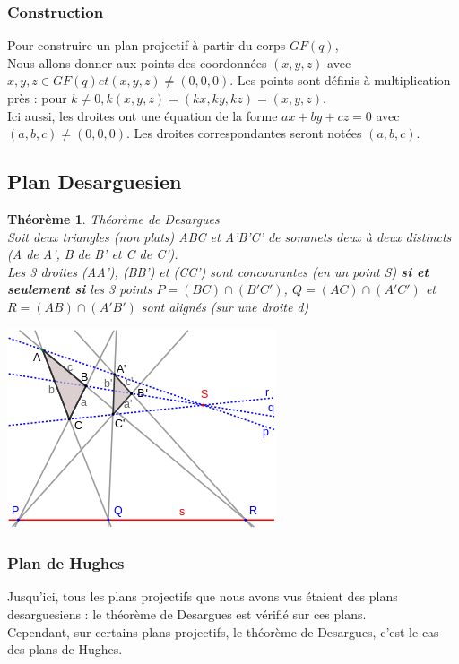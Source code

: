 \documentclass[a4paper]{article}
\newtheorem{Th}[Def]{Théorème}
\begin{document}
\subsubsection*{Construction}
Pour construire un plan projectif à partir du corps $GF(q)$,\\
Nous allons donner aux points des coordonnées $(x,y,z)$ avec $x,y,z \in GF(q) et (x,y,z) \neq (0,0,0)$. Les points sont définis à multiplication près : pour $k \neq 0, k(x,y,z) = (kx,ky,kz) = (x,y,z)$.\\
Ici aussi, les droites ont une équation de la forme $ax + by + cz = 0$ avec $(a,b,c) \neq (0,0,0)$. Les droites correspondantes seront notées $(a,b,c)$.

\subsection{Plan Desarguesien}

\begin{Th}{Th\'eor\`eme de Desargues}\\
  Soit deux triangles (non plats) ABC et A'B'C' de sommets deux à deux distincts (A de A', B de B' et C de C'). \\
  Les 3 droites (AA'), (BB') et (CC') sont concourantes (en un point S) \textbf{si et seulement si} les 3 points $P = (BC) \cap (B'C')$, $Q = (AC) \cap (A'C')$ et $R = (AB) \cap (A'B')$ sont alignés (sur une droite d)
  \end{Th}

\begin{center}
\includegraphics[scale=0.6]{desargues.png}  
\end{center}

\subsubsection{Plan de Hughes}
Jusqu'ici, tous les plans projectifs que nous avons vus étaient des plans desarguesiens : le théorème de Desargues est vérifié sur ces plans.\\
Cependant, sur certains plans projectifs, le théorème de Desargues, c'est le cas des plans de Hughes.\vspace{1\baselineskip}\\
\end{document}
